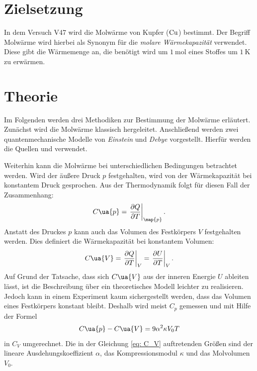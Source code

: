 \setcounter{page}{1}
\section*{Zielsetzung}
In dem Versuch V47 wird die Molwärme von Kupfer ($\ce{Cu}$) bestimmt.
Der Begriff Molwärme wird hierbei als Synonym für die \emph{molare Wärmekapazität} verwendet.
Diese gibt die Wärmemenge an, die benötigt wird um $\SI{1}{\mol}$ eines Stoffes
 um $\SI{1}{\kelvin}$ zu erwärmen.

\section{Theorie}\label{sec:theorie}
Im Folgenden werden drei Methodiken zur Bestimmung der Molwärme erläutert.
Zunächst wird die Molwärme klassisch hergeleitet. Anschließend werden zwei
quantenmechanische Modelle von \emph{Einstein} und \emph{Debye}
vorgestellt. Hierfür werden die Quellen \cite{anleitungV47} und \cite[S. 215]{marx} verwendet.

Weiterhin kann die Molwärme bei unterschiedlichen Bedingungen betrachtet werden.
Wird der äußere Druck $p$ festgehalten, wird von der Wärmekapazität bei konstantem
Druck gesprochen. Aus der Thermodynamik folgt für diesen Fall der Zusammenhang:
\begin{equation}
  \label{eq:C_P}
  C\ua{p} = \left.\frac{\partial Q}{\partial T}\right|_{\map{p}}.
\end{equation}
Anstatt des Druckes $p$ kann auch das Volumen des Festkörpers $V$ festgehalten
werden. Dies definiert die Wärmekapazität bei konstantem Volumen:
\begin{equation}
  \label{eq:C_V}
  C\ua{V} = \left.\frac{\partial Q}{\partial T}\right|_{V} = \left. \frac{\partial U}{\partial T}\right|_{V}.
\end{equation}
Auf Grund der Tatsache, dass sich $C\ua{V}$ aus der inneren Energie $U$ ableiten
lässt, ist die Beschreibung über ein theoretisches Modell leichter zu realisieren.
Jedoch kann in einem Experiment kaum sichergestellt werden, dass das Volumen eines Festkörpers
konstant bleibt. Deshalb wird meist $C_p$ gemessen und mit Hilfe
der Formel
\begin{equation}
  \label{eq: C_V}
  C\ua{p} - C\ua{V} = 9\alpha^2 \kappa V_0 T
\end{equation}
in $C_V$ umgerechnet. Die in der Gleichung \eqref{eq: C_V} auftretenden
Größen sind der lineare Ausdehungskoeffizient $\alpha$, das Kompressionsmodul
$\kappa$ und das Molvolumen $V_0$.
